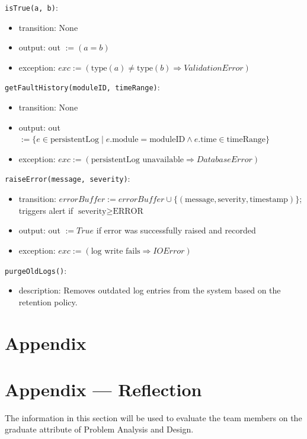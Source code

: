 \documentclass[12pt, titlepage]{article}
\begin{document}
\noindent \texttt{isTrue(a, b)}:
\begin{itemize}
\item transition: None
\item output: out $:= (a = b)$
\item exception: $exc := (\text{type}(a) \neq \text{type}(b) \Rightarrow ValidationError)$
\end{itemize}

\noindent \texttt{getFaultHistory(moduleID, timeRange)}:
\begin{itemize}
\item transition: None
\item output: out $:= \{e \in \text{persistentLog} \mid e.\text{module} = \text{moduleID} \land e.\text{time} \in \text{timeRange}\}$
\item exception: $exc := (\text{persistentLog unavailable} \Rightarrow DatabaseError)$
\end{itemize}

\noindent \texttt{raiseError(message, severity)}:
\begin{itemize}
\item transition: $errorBuffer := errorBuffer \cup \{(\text{message}, \text{severity}, \text{timestamp})\}$; triggers alert if $\text{severity} \geq \text{ERROR}$
\item output: out $:= True$ if error was successfully raised and recorded
\item exception: $exc := (\text{log write fails} \Rightarrow IOError)$
\end{itemize}


\noindent \texttt{purgeOldLogs()}:
\begin{itemize}
    \item description: Removes outdated log entries from the system based on the retention policy.
\end{itemize}



\section{Appendix} \label{Appendix}

\newpage{}

\section*{Appendix --- Reflection}

The information in this section will be used to evaluate the team members on the
graduate attribute of Problem Analysis and Design.
\end{document}
